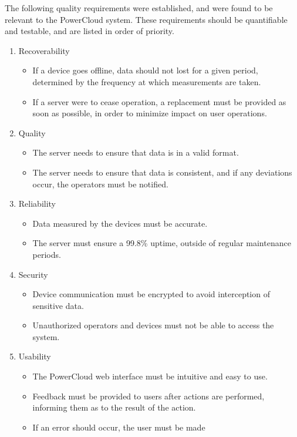 \documentclass{article}
\begin{document}
	The following quality requirements were established, and were found 
	to be relevant to the PowerCloud system. These requirements should be 
	quantifiable and testable, and are listed in order of priority.
	
	\begin{enumerate}
		\item Recoverability
			\begin{itemize}
				\item If a device goes offline, data should not lost for 
				a given period, determined by the frequency at which 
				measurements are taken.
				\item If a server were to cease operation, a replacement 
				must be provided as soon as possible, in order to 
				minimize impact on user operations.
			\end{itemize}
		\item Quality
			\begin{itemize}
				\item The server needs to ensure that data is in a valid 
				format.
				\item The server needs to ensure that data is consistent, 
				and if any deviations occur, the operators must be 
				notified.
			\end{itemize}
		\item Reliability
			\begin{itemize}
				\item Data measured by the devices must be accurate.
				\item The server must ensure a 99.8\% uptime, outside of 
				regular maintenance periods.
			\end{itemize}
		\item Security
			\begin{itemize}
				\item Device communication must be encrypted to avoid 
				interception of sensitive data.
				\item Unauthorized operators and devices must not be able 
				to access the system.
			\end{itemize}
		\item Usability
			\begin{itemize}
				\item The PowerCloud web interface must be intuitive and 
				easy to use.
				\item Feedback must be provided to users after actions 
				are performed, informing them as to the result of the 
				action.
				\item If an error should occur, the user must be made 

\end{itemize}
\end{enumerate}
\end{document}
